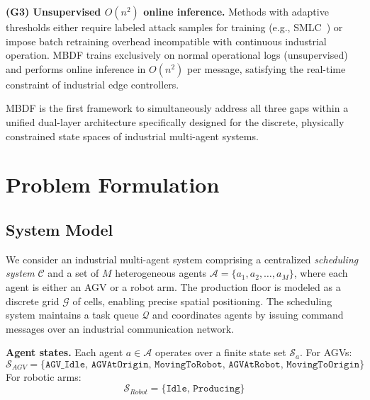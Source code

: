\documentclass[manuscript,screen,review]{acmart}
\begin{document}
\textbf{(G3) Unsupervised $O(n^2)$ online inference.}
Methods with adaptive thresholds either require labeled
attack samples for training (e.g., SMLC~\cite{ref9}) or
impose batch retraining overhead incompatible with
continuous industrial operation. MBDF trains exclusively
on normal operational logs (unsupervised) and performs
online inference in $O(n^2)$ per message, satisfying the
real-time constraint of industrial edge controllers.

MBDF is the first framework to simultaneously address all
three gaps within a unified dual-layer architecture
specifically designed for the discrete, physically
constrained state spaces of industrial multi-agent systems.

\section{Problem Formulation}
\label{sec:problem}

\subsection{System Model}
\label{subsec:sysmodel}

We consider an industrial multi-agent system comprising a
centralized \textit{scheduling system} $\mathcal{C}$ and a
set of $M$ heterogeneous agents
$\mathcal{A} = \{a_1, a_2, \ldots, a_M\}$, where each agent
is either an AGV or a robot arm. The production floor is
modeled as a discrete grid $\mathcal{G}$ of cells, enabling
precise spatial positioning. The scheduling system maintains
a task queue $\mathcal{Q}$ and coordinates agents by issuing
command messages over an industrial communication network.

\textbf{Agent states.} Each agent $a \in \mathcal{A}$ operates
over a finite state set $\mathcal{S}_a$. For AGVs:
\begin{equation}
  \mathcal{S}_{AGV} = \{\texttt{AGV_Idle},\,\texttt{AGVAtOrigin},\,
  \texttt{MovingToRobot},\,\texttt{AGVAtRobot},\,\texttt{MovingToOrigin}\}
  \label{eq:agv_states}
\end{equation}
For robotic arms:
\begin{equation}
  \mathcal{S}_{Robot} = \{\texttt{Idle},\,\texttt{Producing}\}
  \label{eq:arm_states}
\end{equation}
\end{document}
